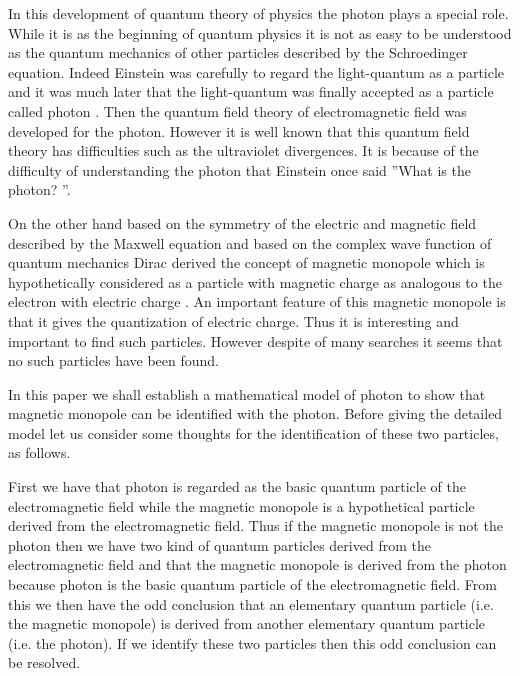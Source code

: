 \documentclass[a4paper,a4paper]{article}
\begin{document}
In this development of quantum theory of physics  the photon plays a special role. While it is as the beginning of quantum physics it is not as easy to be understood as the quantum mechanics of other particles described by the Schroedinger equation. Indeed Einstein was carefully to regard the light-quantum as a particle and it was much later that the light-quantum was finally accepted as a particle called photon \cite{Pai}. Then the quantum field theory of electromagnetic field was developed for the photon. However it is well known that this quantum field theory has difficulties such as the ultraviolet divergences. It is because of the difficulty of understanding the photon that Einstein once said ''What is the photon? ''\cite{Pai}. 

On the other hand based on the symmetry of the electric and magnetic field described by the Maxwell equation and based on the complex wave function of quantum mechanics  Dirac derived the concept of magnetic monopole which  is hypothetically considered as a particle with magnetic charge as analogous to the electron with electric charge \cite{Dir}\cite{Dir2}. An important feature of this magnetic monopole is that it gives the quantization of electric charge. Thus it is interesting and important to find such particles. However despite of many searches it seems that no such particles have been found. 

In this paper we shall establish a mathematical model of photon to show that magnetic monopole can be identified with the photon. Before giving the detailed model let us consider some thoughts for the identification of these two particles, as follows.

First we have that photon is regarded as the basic quantum particle of the electromagnetic field while the magnetic monopole is a hypothetical particle  derived from the electromagnetic field. Thus if the magnetic monopole is not the photon then we have two kind of quantum particles derived from the electromagnetic field and that the magnetic monopole is derived from the photon because photon is the basic quantum particle of the electromagnetic field.
From this we then have the odd conclusion that an elementary quantum particle (i.e. the magnetic monopole) is derived from another elementary quantum particle (i.e. the photon). If we identify these two particles then this odd conclusion can be resolved.
\end{document}
